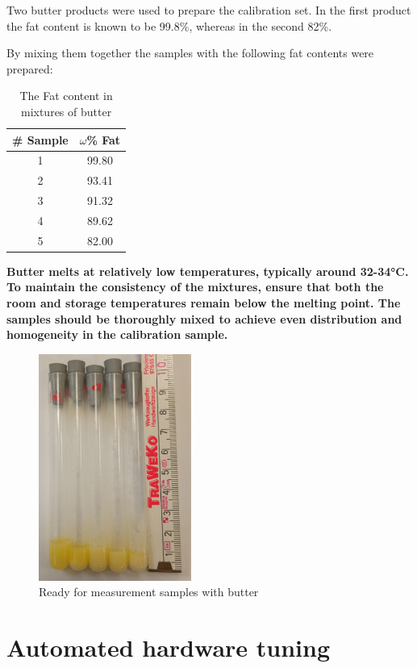 \documentclass[a4paper,12pt]{article}
\begin{document}
Two butter products were used to prepare the calibration set. In the first product the fat content is known to be 99.8\%, whereas in the second 82\%.

By mixing them together the samples with the following fat contents were prepared:
\begin{table}[H]
\centering
\caption{The Fat content in mixtures of butter}
\label{tab:Butter Mixture}
\begin{tabular}{|c|c|}
\hline
\textbf{\#  Sample} & \textbf{$\omega$\% Fat} \\ \hline
1                   & 99.80            \\ \hline
2                   & 93.41            \\ \hline
3                   & 91.32            \\ \hline
4                   & 89.62            \\ \hline
5                   & 82.00            \\ \hline
\end{tabular}
\end{table}

\textbf{
Butter melts at relatively low temperatures, typically around 32-34°C. To maintain the consistency of the mixtures, ensure that both the room and storage temperatures remain below the melting point. The samples should be thoroughly mixed to achieve even distribution and homogeneity in the calibration sample.
}

\begin{figure}[H]
\centering
\includegraphics[width=5cm]{butter.jpg}
\caption{Ready for measurement samples with butter}
\label{fig:butter}
\end{figure}

\newpage
\section{Automated hardware tuning}
\label{sec:Automated hardware tuning}
\end{document}
